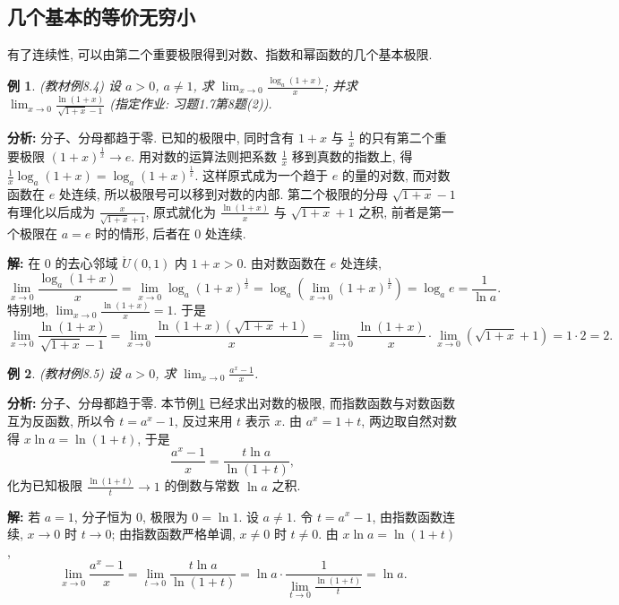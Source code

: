 \documentclass[UTF8,openany]{ctexbook}
\theoremstyle{chinesetextbook}
\newtheorem{example}{例}[section]
\newenvironment{cnsolution}{\par\indent\textbf{解:} \ignorespaces}{\par}
\begin{document}
\subsection{几个基本的等价无穷小}
有了连续性, 可以由第二个重要极限得到对数、指数和幂函数的几个基本极限.
\begin{example}\label{ex:8-4}
\textnormal{(教材例8.4)} 设 $a>0$, $a\ne1$, 求 $\displaystyle\lim_{x\to0}\frac{\log_a(1+x)}x$; 并求 $\displaystyle\lim_{x\to0}\frac{\ln(1+x)}{\sqrt{1+x}-1}$ (指定作业: 习题1.7第8题(2)).
\end{example}
\par\indent\textbf{分析:} 分子、分母都趋于零. 已知的极限中, 同时含有 $1+x$ 与 $\displaystyle\frac1x$ 的只有第二个重要极限 $(1+x)^{\frac1x}\to e$. 用对数的运算法则把系数 $\displaystyle\frac1x$ 移到真数的指数上, 得 $\displaystyle\frac1x\log_a(1+x)=\log_a(1+x)^{\frac1x}$. 这样原式成为一个趋于 $e$ 的量的对数, 而对数函数在 $e$ 处连续, 所以极限号可以移到对数的内部. 第二个极限的分母 $\sqrt{1+x}-1$ 有理化以后成为 $\displaystyle\frac x{\sqrt{1+x}+1}$, 原式就化为 $\displaystyle\frac{\ln(1+x)}x$ 与 $\sqrt{1+x}+1$ 之积, 前者是第一个极限在 $a=e$ 时的情形, 后者在 $0$ 处连续.
\begin{cnsolution}
在 $0$ 的去心邻域 $\mathring U(0,1)$ 内 $1+x>0$. 由对数函数在 $e$ 处连续,
\[
\lim_{x\to0}\frac{\log_a(1+x)}x=\lim_{x\to0}\log_a(1+x)^{\frac1x}=\log_a\left(\lim_{x\to0}(1+x)^{\frac1x}\right)=\log_ae=\frac1{\ln a}.
\]
特别地, $\displaystyle\lim_{x\to0}\frac{\ln(1+x)}x=1$. 于是
\[
\lim_{x\to0}\frac{\ln(1+x)}{\sqrt{1+x}-1}=\lim_{x\to0}\frac{\ln(1+x)\left(\sqrt{1+x}+1\right)}x=\lim_{x\to0}\frac{\ln(1+x)}x\cdot\lim_{x\to0}\left(\sqrt{1+x}+1\right)=1\cdot2=2.
\]
\end{cnsolution}
\begin{example}\label{ex:8-5}
\textnormal{(教材例8.5)} 设 $a>0$, 求 $\displaystyle\lim_{x\to0}\frac{a^x-1}x$.
\end{example}
\par\indent\textbf{分析:} 分子、分母都趋于零. 本节例\ref{ex:8-4} 已经求出对数的极限, 而指数函数与对数函数互为反函数, 所以令 $t=a^x-1$, 反过来用 $t$ 表示 $x$. 由 $a^x=1+t$, 两边取自然对数得 $x\ln a=\ln(1+t)$, 于是
\[
\frac{a^x-1}x=\frac{t\ln a}{\ln(1+t)},
\]
化为已知极限 $\displaystyle\frac{\ln(1+t)}t\to1$ 的倒数与常数 $\ln a$ 之积.
\begin{cnsolution}
若 $a=1$, 分子恒为 $0$, 极限为 $0=\ln1$. 设 $a\ne1$. 令 $t=a^x-1$, 由指数函数连续, $x\to0$ 时 $t\to0$; 由指数函数严格单调, $x\ne0$ 时 $t\ne0$. 由 $x\ln a=\ln(1+t)$,
\[
\lim_{x\to0}\frac{a^x-1}x=\lim_{t\to0}\frac{t\ln a}{\ln(1+t)}=\ln a\cdot\frac1{\displaystyle\lim_{t\to0}\frac{\ln(1+t)}t}=\ln a.
\]
\end{cnsolution}
\end{document}

